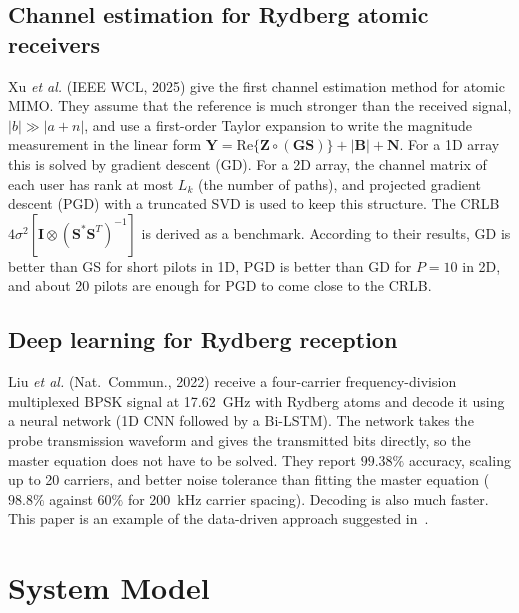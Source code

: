 \documentclass[11pt,a4paper]{article}
\begin{document}
\subsection{\texorpdfstring{Channel estimation for Rydberg atomic receivers~\cite{xu2025channel}}{Channel estimation for Rydberg atomic receivers}}

Xu \textit{et al.} (IEEE WCL, 2025) give the first channel estimation method for atomic MIMO.
They assume that the reference is much stronger than the received signal, $|b|\gg|a+n|$, and
use a first-order Taylor expansion to write the magnitude measurement in the linear form
$\mathbf Y=\mathrm{Re}\{\mathbf Z\circ(\mathbf G\mathbf S)\}+|\mathbf B|+\mathbf N$. For a 1D array this
is solved by gradient descent (GD). For a 2D array, the channel matrix of each user has rank
at most $L_k$ (the number of paths), and projected gradient descent (PGD) with a truncated
SVD is used to keep this structure. The CRLB
$4\sigma^2[\mathbf I\otimes(\mathbf S^*\mathbf S^T)^{-1}]$ is derived as a benchmark. According to
their results, GD is better than GS for short pilots in 1D, PGD is better than GD for $P=10$
in 2D, and about 20 pilots are enough for PGD to come close to the CRLB.

\subsection{\texorpdfstring{Deep learning for Rydberg reception~\cite{liu2022deep}}{Deep learning for Rydberg reception}}

Liu \textit{et al.} (Nat.\ Commun., 2022) receive a four-carrier frequency-division
multiplexed BPSK signal at 17.62~GHz with Rydberg atoms and decode it using a neural network
(1D CNN followed by a Bi-LSTM). The network takes the probe transmission waveform and gives
the transmitted bits directly, so the master equation does not have to be solved. They report
$99.38\%$ accuracy, scaling up to 20 carriers, and better noise tolerance than fitting the
master equation ($98.8\%$ against $60\%$ for 200~kHz carrier spacing). Decoding is also much
faster. This paper is an example of the data-driven approach suggested in~\cite{cui2026rare}.


\section{System Model}
\label{sec:model}
\end{document}
